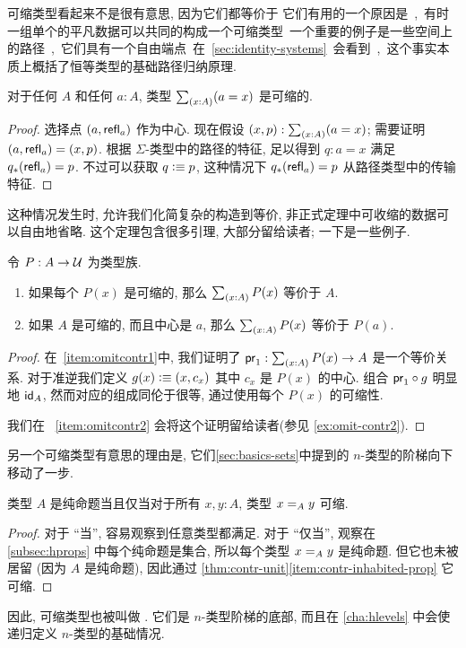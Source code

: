 可缩类型看起来不是很有意思, 因为它们都等价于 \unit.
它们有用的一个原因是, 有时一组单个的平凡数据可以共同的构成一个可缩类型.
一个重要的例子是一些空间上的路径, 它们具有一个自由端点.
在 \cref{sec:identity-systems} 会看到, 这个事实本质上概括了恒等类型的基础路径归纳原理.


\begin{lem}
    \label{thm:contr-paths}
    对于任何 $A$ 和任何 $a:A$, 类型 $\sm{x:A} (a=x)$ 是可缩的.
\end{lem}
\begin{proof}
    选择点 $(a,\refl a)$ 作为中心.
    现在假设 $(x,p):\sm{x:A}(a=x)$;
    需要证明 $(a,\refl a) = (x,p)$.
    根据 $\Sigma$-类型中的路径的特征, 足以得到 $q:a=x$ 满足 $\trans{q}{\refl a} = p$.
    不过可以获取 $q\defeq p$, 这种情况下 $\trans{q}{\refl a} = p$ 从路径类型中的传输特征.
\end{proof}

这种情况发生时, 允许我们化简复杂的构造到等价, 非正式定理中可收缩的数据可以自由地省略.
这个定理包含很多引理, 大部分留给读者; 一下是一些例子.

\begin{lem}
    \label{thm:omit-contr}
    令 $P:A\to\type$ 为类型族.
    \begin{enumerate}
        \item 如果每个 $P(x)$ 是可缩的, 那么 $\sm{x:A} P(x)$ 等价于 $A$.\label{item:omitcontr1}
        \item 如果 $A$ 是可缩的, 而且中心是 $a$, 那么 $\sm{x:A} P(x)$ 等价于 $P(a)$.\label{item:omitcontr2}
    \end{enumerate}
\end{lem}
\begin{proof}
    在~\ref{item:omitcontr1}中, 我们证明了 $\proj1:\sm{x:A} P(x) \to A$ 是一个等价关系.
    对于准逆我们定义 $g(x)\defeq (x,c_x)$ 其中 $c_x$ 是 $P(x)$ 的中心.
    组合 $\proj1 \circ g$ 明显地 $\idfunc[A]$, 然而对应的组成同伦于很等, 通过使用每个 $P(x)$ 的可缩性.

    我们在 ~\ref{item:omitcontr2} 会将这个证明留给读者(参见 \cref{ex:omit-contr2}).
\end{proof}

另一个可缩类型有意思的理由是, 它们\cref{sec:basics-sets}中提到的 $n$-类型的阶梯向下移动了一步.

\begin{lem}
    \label{thm:prop-minusonetype}
    类型 $A$ 是纯命题当且仅当对于所有 $x,y:A$, 类型 $\id[A]xy$ 可缩.
\end{lem}
\begin{proof}
    对于 ``当'', 容易观察到任意类型都满足.
    对于 ``仅当'', 观察在 \cref{subsec:hprops} 中每个纯命题是集合, 所以每个类型 $\id[A]xy$ 是纯命题.
    但它也未被居留 (因为 $A$ 是纯命题), 因此通过 \cref{thm:contr-unit}\ref{item:contr-inhabited-prop} 它可缩.
\end{proof}

因此, 可缩类型也被叫做 .
它们是 $n$-类型阶梯的底部, 而且在 \cref{cha:hlevels} 中会使递归定义 $n$-类型的基础情况.

%
%
